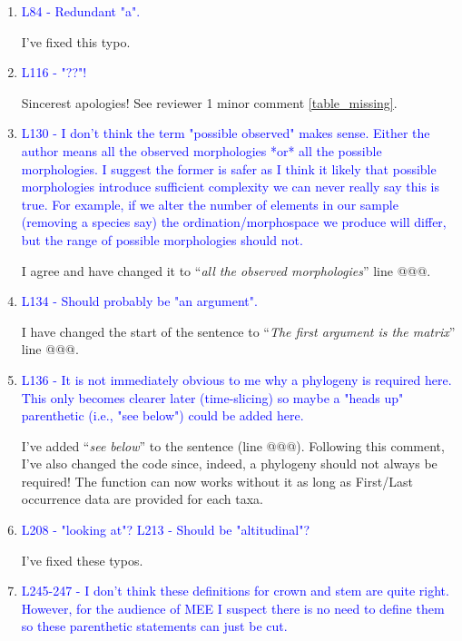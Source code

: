 \documentclass[12pt,letterpaper]{article}
\begin{document}
\begin{enumerate}
\item{\textcolor{blue}{L84 - Redundant "a".}}

I've fixed this typo.

\item{\textcolor{blue}{L116 - "??"!}}

Sincerest apologies! See reviewer 1 minor comment \ref{table_missing}.

\item{\textcolor{blue}{L130 - I don't think the term "possible observed" makes sense. Either the author means all the observed morphologies *or* all the possible morphologies. I suggest the former is safer as I think it likely that possible morphologies introduce sufficient complexity we can never really say this is true. For example, if we alter the number of elements in our sample (removing a species say) the ordination/morphospace we produce will differ, but the range of possible morphologies should not.}}

I agree and have changed it to ``\textit{all the observed morphologies}'' line @@@.

\item{\textcolor{blue}{L134 - Should probably be "an argument".}}

I have changed the start of the sentence to ``\textit{The first argument is the matrix}'' line @@@.

\item{\textcolor{blue}{L136 - It is not immediately obvious to me why a phylogeny is required here. This only becomes clearer later (time-slicing) so maybe a "heads up" parenthetic (i.e., "see below") could be added here.}}

I've added ``\textit{see below}'' to the sentence (line @@@).
Following this comment, I've also changed the code since, indeed, a phylogeny should not always be required!
The function can now works without it as long as First/Last occurrence data are provided for each taxa.

\item{\textcolor{blue}{L208 - "looking at"? L213 - Should be "altitudinal"?}}
\label{altitude}

I've fixed these typos.

\item{\textcolor{blue}{L245-247 - I don't think these definitions for crown and stem are quite right. However, for the audience of MEE I suspect there is no need to define them so these parenthetic statements can just be cut.}}


\end{enumerate}
\end{document}
